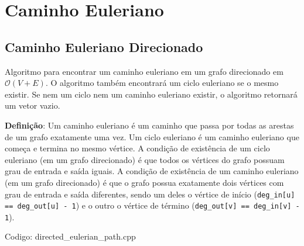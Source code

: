 \documentclass[10pt, a4paper, oneside]{book}
\begin{document}
\section{Caminho Euleriano}
\subsection{Caminho Euleriano Direcionado}


Algoritmo para encontrar um caminho euleriano em um grafo direcionado em $\mathcal{O}(V + E)$. O algoritmo também encontrará um ciclo euleriano se o mesmo existir. Se nem um ciclo nem um caminho euleriano existir, o algoritmo retornará um vetor vazio.



\textbf{Definição}: Um caminho euleriano é um caminho que passa por todas as arestas de um grafo exatamente uma vez. Um ciclo euleriano é um caminho euleriano que começa e termina no mesmo vértice. A condição de existência de um ciclo euleriano (em um grafo direcionado) é que todos os vértices do grafo possuam grau de entrada e saída iguais. A condição de existência de um caminho euleriano (em um grafo direcionado) é que o grafo possua exatamente dois vértices com grau de entrada e saída diferentes, sendo um deles o vértice de início (\texttt{deg\_in[u] == deg\_out[u] - 1}) e o outro o vértice de término (\texttt{deg\_out[v] == deg\_in[v] - 1}).
\hfill

Codigo: directed\_eulerian\_path.cpp
\end{document}
